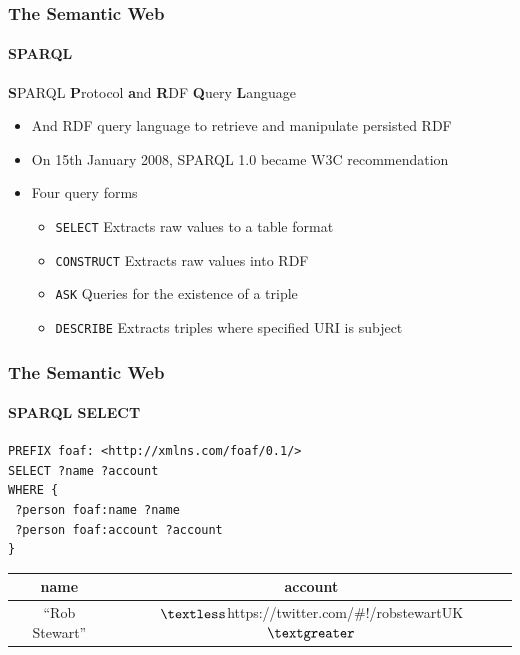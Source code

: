 \documentclass{beamer}
\begin{document}
\begin{frame}[fragile]
\frametitle{The Semantic Web}
\framesubtitle{SPARQL}

\textbf{S}PARQL \textbf{P}rotocol \textbf{a}nd \textbf{R}DF
\textbf{Q}uery \textbf{L}anguage

\begin{itemize}
\item And RDF query language to retrieve and manipulate persisted RDF
\item On 15th January 2008, SPARQL 1.0 became W3C recommendation

  \bigskip
\item Four query forms
  
  \begin{itemize}
  \item \texttt{SELECT} Extracts raw values to a table format
  \item \texttt{CONSTRUCT} Extracts raw values into RDF
  \item \texttt{ASK} Queries for the existence of a triple
  \item \texttt{DESCRIBE} Extracts triples where specified URI is subject
  \end{itemize}
  
\end{itemize}

\end{frame}

\begin{frame}[fragile]
\frametitle{The Semantic Web}
\framesubtitle{SPARQL SELECT}


\begin{verbatim}
PREFIX foaf: <http://xmlns.com/foaf/0.1/>
SELECT ?name ?account
WHERE {
 ?person foaf:name ?name
 ?person foaf:account ?account
}
\end{verbatim}

\bigskip

\begin{center}
\begin{tabular}{| c | c | }
\hline
\textbf{name} & \textbf{account} \\
\hline
``Rob Stewart'' & $\textless$https://twitter.com/\#!/robstewartUK$\textgreater$ \\
\hline
\end{tabular}
\end{center}

\end{frame}
\end{document}
